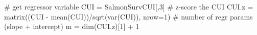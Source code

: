 \begin{Schunk}
\begin{Sinput}
 # get regressor variable
 CUI = SalmonSurvCUI[,3]
 # z-score the CUI
 CUI.z = matrix((CUI - mean(CUI))/sqrt(var(CUI)), nrow=1)
 # number of regr params (slope + intercept)
 m = dim(CUI.z)[1] + 1
\end{Sinput}
\end{Schunk}
